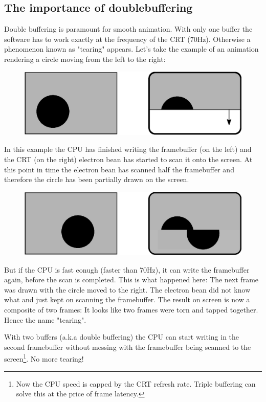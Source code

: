 \documentclass[book.tex]{subfiles}
\begin{document}
\subsection{The importance of doublebuffering}
Double buffering is paramount for smooth animation. With only one buffer the software has to work exactly at the frequency of the CRT (70Hz). Otherwise a phenomenon known as "tearing" appears. Let's take the example of an animation rendering a circle moving from the left to the right:
\par
\begin{figure}[H]
\centering
\includegraphics[width=\textwidth]{imgs/doublebuffer_before.eps}
\end{figure}
\par
In this example the CPU has finished writing the framebuffer (on the left) and the CRT (on the right) electron bean has started to scan it onto the screen. At this point in time the electron bean has scanned half the framebuffer and therefore the circle has been partially drawn on the screen.
\par
\begin{figure}[H]
\centering
\includegraphics[width=\textwidth]{imgs/doublebuffer_after.eps}
\end{figure}
\par
But if the CPU is fast eonugh (faster than 70Hz), it can write the framebuffer again, before the scan is completed. This is what happened here: The next frame was drawn with the circle moved to the right. The electron bean did not know what and just kept on scanning the framebuffer. The result on screen is now a composite of two frames: It looks like two frames were torn and tapped together. Hence the name "tearing".\\
\par
With two buffers (a.k.a double buffering) the CPU can start writing in the second framebuffer without messing with the framebuffer being scanned to the screen\footnote{Now the CPU speed is capped by the CRT refresh rate. Triple buffering can solve this at the price of frame latency.}. No more tearing!
\end{document}
